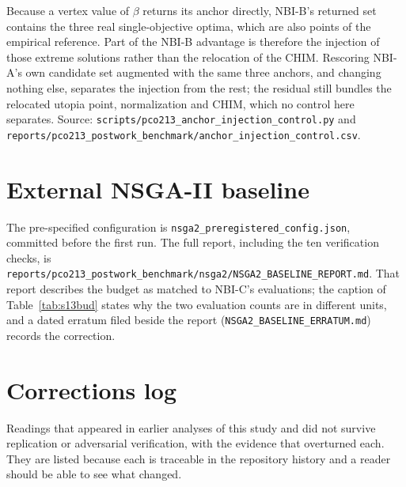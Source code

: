 \documentclass[11pt,a4paper]{article}
\begin{document}
Because a vertex value of $\beta$ returns its anchor directly, NBI-B's returned set contains the three real
single-objective optima, which are also points of the empirical reference. Part of the NBI-B advantage is therefore
the injection of those extreme solutions rather than the relocation of the CHIM. Rescoring NBI-A's own candidate set
augmented with the same three anchors, and changing nothing else, separates the injection from the rest; the
residual still bundles the relocated utopia point, normalization and CHIM, which no control here separates. Source:
\texttt{scripts/\allowbreak pco213\_anchor\_injection\_control.py} and
\texttt{reports/\allowbreak pco213\_postwork\_benchmark/\allowbreak anchor\_injection\_control.csv}.

\section{External NSGA-II baseline}
\label{sec:s13}




The pre-specified configuration is \texttt{nsga2\_\allowbreak preregistered\_\allowbreak config.json}, committed before the first run. The
full report, including the ten verification checks, is
\texttt{reports/\allowbreak pco213\_\allowbreak postwork\_\allowbreak benchmark/\allowbreak nsga2/\allowbreak NSGA2\_\allowbreak BASELINE\_\allowbreak REPORT.md}.
That report describes the budget as matched to NBI-C's evaluations; the caption of Table~\ref{tab:s13bud} states why
the two evaluation counts are in different units, and a dated erratum filed beside the report
(\texttt{NSGA2\_\allowbreak BASELINE\_\allowbreak ERRATUM.md}) records the correction.

\section{Corrections log}
\label{sec:s14}

Readings that appeared in earlier analyses of this study and did not survive replication or adversarial verification,
with the evidence that overturned each. They are listed because each is traceable in the repository history and a
reader should be able to see what changed.
\end{document}
